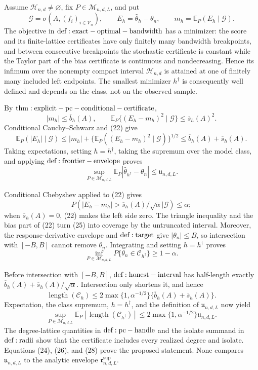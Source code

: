 Assume \(\mathcal H_{n,d}\ne\varnothing\), fix \(P\in\mathcal M_{n,d,L}\), and put
\[
 \mathcal G=\sigma\!\left(A,(f_i)_{i\in\mathcal V_n}\right),
 \qquad E_h=\widehat\theta_h-\theta_n,
 \qquad m_h=\mathbb E_P(E_h\mid\mathcal G).
\tag{21}
\]
The objective in \({\rm def:exact-optimal-bandwidth}\) has a minimizer: the score and its finite-lattice certificates have only finitely many bandwidth breakpoints, and between consecutive breakpoints the stochastic certificate is constant while the Taylor part of the bias certificate is continuous and nondecreasing.  Hence its infimum over the nonempty compact interval \(\mathcal H_{n,d}\) is attained at one of finitely many included left endpoints.  The smallest minimizer \(h^\dagger\) is consequently well defined and depends on the class, not on the observed sample.

By \({\rm thm:explicit-pc-conditional-certificate}\),
\[
 |m_h|\le\overline b_h(A),
 \qquad
 \mathbb E_P\{(E_h-m_h)^2\mid\mathcal G\}
 \le\overline s_h(A)^2.
\tag{22}
\]
Conditional Cauchy--Schwarz and (22) give
\[
 \mathbb E_P(|E_h|\mid\mathcal G)
 \le |m_h|+\{\mathbb E_P((E_h-m_h)^2\mid\mathcal G)\}^{1/2}
 \le\overline b_h(A)+\overline s_h(A).
\tag{23}
\]
Taking expectations, setting \(h=h^\dagger\), taking the supremum over the model class, and applying \({\rm def:frontier-envelope}\) proves
\[
 \sup_{P\in\mathcal M_{n,d,L}}
 \mathbb E_P|\widehat\theta_{h^\dagger}-\theta_n|
 \le\mathfrak u_{n,d,L}.
\tag{24}
\]

Conditional Chebyshev applied to (22) gives
\[
 P\!\left(
 |E_h-m_h|>\overline s_h(A)/\sqrt\alpha
 \mathrel{\Big|}\mathcal G\right)\le\alpha;
\tag{25}
\]
when \(\overline s_h(A)=0\), (22) makes the left side zero.  The triangle inequality and the bias part of (22) turn (25) into coverage by the untruncated interval.  Moreover, the response-derivative envelope and \({\rm def:target}\) give \(|\theta_n|\le B\), so intersection with \([-B,B]\) cannot remove \(\theta_n\).  Integrating and setting \(h=h^\dagger\) proves
\[
 \inf_{P\in\mathcal M_{n,d,L}}P\{\theta_n\in\mathcal C_{h^\dagger}\}
 \ge1-\alpha.
\tag{26}
\]

Before intersection with \([-B,B]\), \({\rm def:honest-interval}\) has half-length exactly \(\overline b_h(A)+\overline s_h(A)/\sqrt\alpha\).  Intersection only shortens it, and hence
\[
 \operatorname{length}(\mathcal C_h)
 \le2\max\{1,\alpha^{-1/2}\}
 \{\overline b_h(A)+\overline s_h(A)\}.
\tag{27}
\]
Expectation, the class supremum, \(h=h^\dagger\), and the definition of \(\mathfrak u_{n,d,L}\) now yield
\[
 \sup_{P\in\mathcal M_{n,d,L}}
 \mathbb E_P[\operatorname{length}(\mathcal C_{h^\dagger})]
 \le2\max\{1,\alpha^{-1/2}\}\mathfrak u_{n,d,L}.
\tag{28}
\]
The degree-lattice quantities in \({\rm def:pc-handle}\) and the isolate summand in \({\rm def:radii}\) show that the certificate includes every realized degree and isolate.  Equations (24), (26), and (28) prove the proposed statement.  None compares \(\mathfrak u_{n,d,L}\) to the analytic envelope \(\mathfrak r^{\mathrm{sup}}_{n,d,L}\).